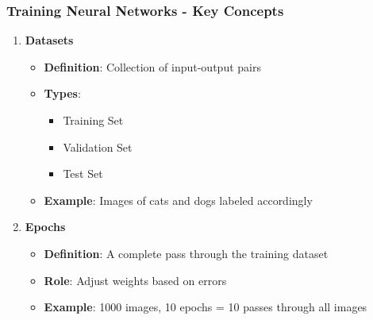 \documentclass{beamer}
\begin{document}
\begin{frame}[fragile]
    \frametitle{Training Neural Networks - Key Concepts}
    \begin{enumerate}
        \item \textbf{Datasets}
        \begin{itemize}
            \item \textbf{Definition}: Collection of input-output pairs
            \item \textbf{Types}:
            \begin{itemize}
                \item Training Set
                \item Validation Set
                \item Test Set
            \end{itemize}
            \item \textbf{Example}: Images of cats and dogs labeled accordingly
        \end{itemize}
        
        \item \textbf{Epochs}
        \begin{itemize}
            \item \textbf{Definition}: A complete pass through the training dataset
            \item \textbf{Role}: Adjust weights based on errors
            \item \textbf{Example}: 1000 images, 10 epochs = 10 passes through all images
        \end{itemize}
    \end{enumerate}
\end{frame}
\end{document}
